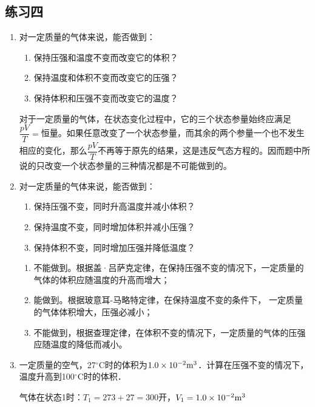 \subsection{练习四}

\begin{enumerate}
	\item 对一定质量的气体来说，能否做到：
	\begin{enumerate}
	\item	保持压强和温度不变而改变它的体积？
	\item	保持温度和体积不变而改变它的压强？
	\item	保持体积和压强不变而改变它的温度？	 
	\end{enumerate}

\begin{solution}
对于一定质量的气体，在状态变化过程中，它的三个状态参量始终应满足$\dfrac{pV}{T}=$恒量。如果任意改变了一个状态参量，而其余的两个参量一个也不发生相应的变化，那么$\dfrac{pV}{T}$不再等于原先的结果，这是违反气态方程的。因而题中所说的只改变一个状态参量的三种情况都是不可能做到的。
\end{solution}
\item  对一定质量的气体来说，能否做到：
\begin{enumerate}
\item 保持压强不变，同时升高温度并减小体积？
\item 保持温度不变，同时增加体积并减小压强？
\item 保持体积不变，同时增加压强并降低温度？
\end{enumerate}

\begin{solution}
\begin{enumerate}
    \item 不能做到。根据盖·吕萨克定律，在保持压强不变的情况下，一定质量的气体的体积应随温度的升高而增大；
    \item 能做到。根据玻意耳-马略特定律，在保持温度不变的条件下，
    一定质量的气体体积增大，压强必减小；
    \item 不能做到，根据查理定律，在体积不变的情况下，一定质量的气体的压强应随温度的降低而减小。
\end{enumerate}
\end{solution}
\item  一定质量的空气，27$^\circ$C时的体积为$1.0\times 10^{-2}{\rm m}^3$．计算在压强不变的情况下，温度升高到100$^\circ$C时的体积．

\begin{solution}
气体在状态1时：$T_1=273+27=300$开，$V_1=1.0\times10^{-2}{\rm m^3}$


\end{solution}
\end{enumerate}
